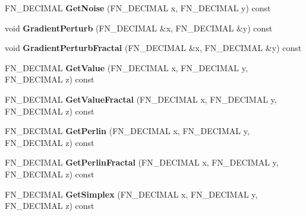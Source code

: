 \begin{DoxyCompactItemize}
\item 
\mbox{\label{classFastNoise_a61722acaa5692a40ee939d578b6a40d1}} 
F\+N\+\_\+\+D\+E\+C\+I\+M\+AL {\bfseries Get\+Noise} (F\+N\+\_\+\+D\+E\+C\+I\+M\+AL x, F\+N\+\_\+\+D\+E\+C\+I\+M\+AL y) const
\item 
\mbox{\label{classFastNoise_a84d51e4e3c6abb7897954a4e77194e03}} 
void {\bfseries Gradient\+Perturb} (F\+N\+\_\+\+D\+E\+C\+I\+M\+AL \&x, F\+N\+\_\+\+D\+E\+C\+I\+M\+AL \&y) const
\item 
\mbox{\label{classFastNoise_ab3d6570d2a46f693ef4c63f10ea872ca}} 
void {\bfseries Gradient\+Perturb\+Fractal} (F\+N\+\_\+\+D\+E\+C\+I\+M\+AL \&x, F\+N\+\_\+\+D\+E\+C\+I\+M\+AL \&y) const
\item 
\mbox{\label{classFastNoise_ab2424cc7921a15da6eb683ab3bbfcbac}} 
F\+N\+\_\+\+D\+E\+C\+I\+M\+AL {\bfseries Get\+Value} (F\+N\+\_\+\+D\+E\+C\+I\+M\+AL x, F\+N\+\_\+\+D\+E\+C\+I\+M\+AL y, F\+N\+\_\+\+D\+E\+C\+I\+M\+AL z) const
\item 
\mbox{\label{classFastNoise_a972ef8f462048015489604783155fd17}} 
F\+N\+\_\+\+D\+E\+C\+I\+M\+AL {\bfseries Get\+Value\+Fractal} (F\+N\+\_\+\+D\+E\+C\+I\+M\+AL x, F\+N\+\_\+\+D\+E\+C\+I\+M\+AL y, F\+N\+\_\+\+D\+E\+C\+I\+M\+AL z) const
\item 
\mbox{\label{classFastNoise_ac8379b662e050faf5302026616fc56af}} 
F\+N\+\_\+\+D\+E\+C\+I\+M\+AL {\bfseries Get\+Perlin} (F\+N\+\_\+\+D\+E\+C\+I\+M\+AL x, F\+N\+\_\+\+D\+E\+C\+I\+M\+AL y, F\+N\+\_\+\+D\+E\+C\+I\+M\+AL z) const
\item 
\mbox{\label{classFastNoise_a6f4a364104bbc65cda5135a904737de9}} 
F\+N\+\_\+\+D\+E\+C\+I\+M\+AL {\bfseries Get\+Perlin\+Fractal} (F\+N\+\_\+\+D\+E\+C\+I\+M\+AL x, F\+N\+\_\+\+D\+E\+C\+I\+M\+AL y, F\+N\+\_\+\+D\+E\+C\+I\+M\+AL z) const
\item 
\mbox{\label{classFastNoise_a4ab5e306f72c428fef0e69be3166c07d}} 
F\+N\+\_\+\+D\+E\+C\+I\+M\+AL {\bfseries Get\+Simplex} (F\+N\+\_\+\+D\+E\+C\+I\+M\+AL x, F\+N\+\_\+\+D\+E\+C\+I\+M\+AL y, F\+N\+\_\+\+D\+E\+C\+I\+M\+AL z) const
\item 

\end{DoxyCompactItemize}
